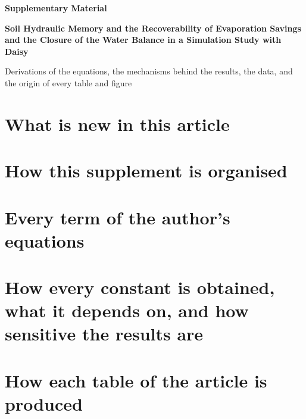 
\renewcommand{\thesection}{S\arabic{section}}
\renewcommand{\theequation}{S\arabic{equation}}
\renewcommand{\thetable}{S\arabic{table}}
\renewcommand{\thefigure}{S\arabic{figure}}


\begin{center}{\large\bfseries Supplementary Material\par}\vspace{4pt}
{\Large\bfseries Soil Hydraulic Memory and the Recoverability of Evaporation Savings and the Closure of the Water Balance in a Simulation Study with Daisy\par}\vspace{6pt}
{\normalsize Derivations of the equations, the mechanisms behind the results, the data, and the origin of every table and figure\par}\end{center}
\authorblock
\tableofcontents
\clearpage
\section{What is new in this article}


\section{How this supplement is organised}




\section{Every term of the author's equations}


\section{How every constant is obtained, what it depends on, and how sensitive the results are}


\section{How each table of the article is produced}


